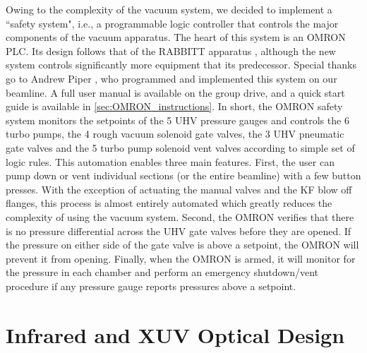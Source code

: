 Owing to the complexity of the vacuum system, we decided to implement a ``safety system", i.e., a programmable logic controller that controls the major components of the vacuum apparatus. The heart of this system is an OMRON PLC. Its design follows that of the RABBITT apparatus \cite{chirlaAttosecondPulseGeneration2011}, although the new system controls significantly more equipment that its predecessor. Special thanks go to Andrew Piper \cite{piperAndrewPiperDissertation}, who programmed and implemented this system on our beamline. A full user manual is available on the group drive, and a quick start guide is available in \cref{sec:OMRON_instructions}. In short, the OMRON safety system monitors the setpoints of the 5 UHV pressure gauges and controls the 6 turbo pumps, the 4 rough vacuum solenoid gate valves, the 3 UHV pneumatic gate valves and the 5 turbo pump solenoid vent valves according to simple set of logic rules. This automation enables three main features. First, the user can pump down or vent individual sections (or the entire beamline) with a few button presses. With the exception of actuating the manual valves and the KF blow off flanges, this process is almost entirely automated which greatly reduces the complexity of using the vacuum system. Second, the OMRON verifies that there is no pressure differential across the UHV gate valves before they are opened. If the pressure on either side of the gate valve is above a setpoint, the OMRON will prevent it from opening. Finally, when the OMRON is armed, it will monitor for the pressure in each chamber and perform an emergency shutdown/vent procedure if any pressure gauge reports pressures above a setpoint.

\section{Infrared and XUV Optical Design}
\label{sec:Interferometer_Design}

